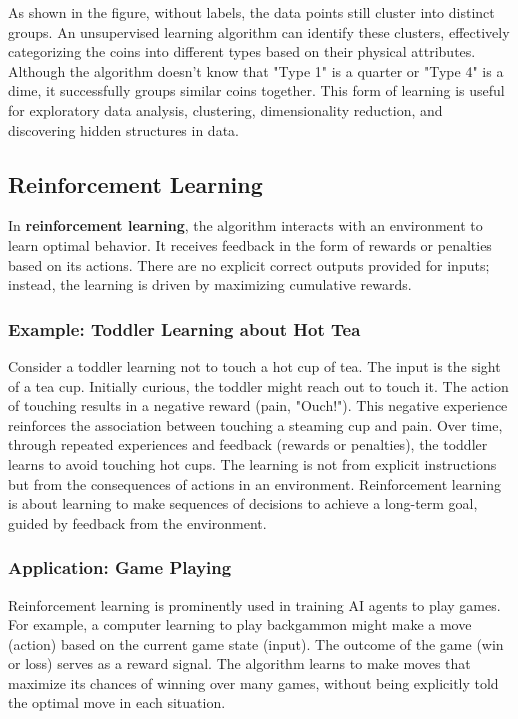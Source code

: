 \documentclass{article}
\begin{document}
As shown in the figure, without labels, the data points still cluster into distinct groups. An unsupervised learning algorithm can identify these clusters, effectively categorizing the coins into different types based on their physical attributes.  Although the algorithm doesn't know that "Type 1" is a quarter or "Type 4" is a dime, it successfully groups similar coins together.  This form of learning is useful for exploratory data analysis, clustering, dimensionality reduction, and discovering hidden structures in data.

\subsection{Reinforcement Learning}
In \textbf{reinforcement learning}, the algorithm interacts with an environment to learn optimal behavior.  It receives feedback in the form of rewards or penalties based on its actions. There are no explicit correct outputs provided for inputs; instead, the learning is driven by maximizing cumulative rewards.

\subsubsection{Example: Toddler Learning about Hot Tea}
Consider a toddler learning not to touch a hot cup of tea. The input is the sight of a tea cup. Initially curious, the toddler might reach out to touch it. The action of touching results in a negative reward (pain, "Ouch!"). This negative experience reinforces the association between touching a steaming cup and pain. Over time, through repeated experiences and feedback (rewards or penalties), the toddler learns to avoid touching hot cups. The learning is not from explicit instructions but from the consequences of actions in an environment. Reinforcement learning is about learning to make sequences of decisions to achieve a long-term goal, guided by feedback from the environment.

\subsubsection{Application: Game Playing}
Reinforcement learning is prominently used in training AI agents to play games. For example, a computer learning to play backgammon might make a move (action) based on the current game state (input). The outcome of the game (win or loss) serves as a reward signal. The algorithm learns to make moves that maximize its chances of winning over many games, without being explicitly told the optimal move in each situation.
\end{document}
